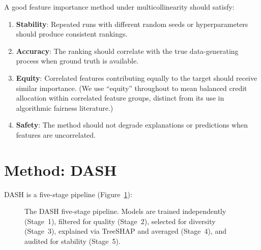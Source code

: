 \documentclass[11pt]{article}
\newcommand{\dash}{\textsc{DASH}}
\begin{document}
A good feature importance method under multicollinearity should satisfy:
\begin{enumerate}
  \item \textbf{Stability}: Repeated runs with different random seeds or
    hyperparameters should produce consistent rankings.
  \item \textbf{Accuracy}: The ranking should correlate with the true
    data-generating process when ground truth is available.
  \item \textbf{Equity}: Correlated features contributing equally to the
    target should receive similar importance. (We use ``equity'' throughout
    to mean balanced credit allocation within correlated feature groups,
    distinct from its use in algorithmic fairness literature.)
  \item \textbf{Safety}: The method should not degrade explanations or
    predictions when features are uncorrelated.
\end{enumerate}


\section{Method: DASH}
\label{sec:method}

\dash{} is a five-stage pipeline (Figure~\ref{fig:pipeline}):

\begin{figure}[htbp]
\centering
{}
\caption{The \dash{} five-stage pipeline. Models are trained independently
(Stage~1), filtered for quality (Stage~2), selected for diversity (Stage~3),
explained via TreeSHAP and averaged (Stage~4), and audited for stability
(Stage~5).}
\label{fig:pipeline}
\end{figure}
\end{document}
